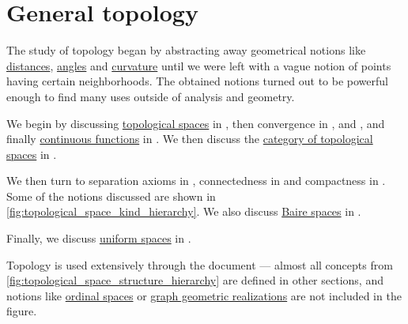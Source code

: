 \section{General topology}\label{sec:general_topology}

The study of topology began by abstracting away geometrical notions like \hyperref[def:metric_space]{distances}, \hyperref[def:angle]{angles} and \hyperref[def:regular_curve_curvature]{curvature} until we were left with a vague notion of points having certain neighborhoods. The obtained notions turned out to be powerful enough to find many uses outside of analysis and geometry.

We begin by discussing \hyperref[def:topological_space]{topological spaces} in , then convergence in ,  and , and finally \hyperref[def:global_continuity]{continuous functions} in . We then discuss the \hyperref[def:category_of_small_topological_spaces]{category of topological spaces} in .

We then turn to separation axioms in , connectedness in  and compactness in . Some of the notions discussed are shown in \cref{fig:topological_space_kind_hierarchy}. We also discuss \hyperref[def:baire_space]{Baire spaces} in .

Finally, we discuss \hyperref[def:uniform_space]{uniform spaces} in .

Topology is used extensively through the document --- almost all concepts from \cref{fig:topological_space_structure_hierarchy} are defined in other sections, and notions like \hyperref[def:ordinal_space]{ordinal spaces} or \hyperref[def:directed_multigraph_geometric_realization]{graph geometric realizations} are not included in the figure.

